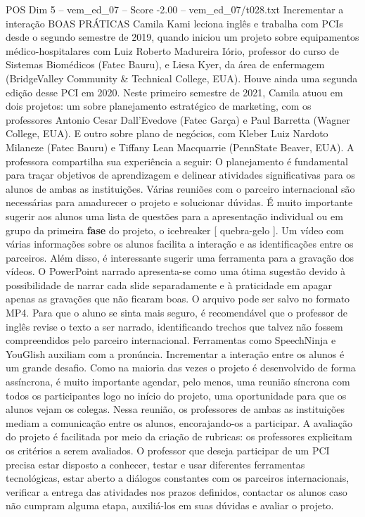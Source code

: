 \begin{textsample}{POS Dim 5 – vem\_ed\_07 – Score -2.00 – vem\_ed\_07/t028.txt}  \label{ex:f5_pos_156}
Incrementar a interação BOAS PRÁTICAS Camila Kami leciona inglês e trabalha com PCIs desde o segundo semestre de 2019, quando iniciou um projeto sobre equipamentos médico-hospitalares com Luiz Roberto Madureira Iório, professor do curso de Sistemas Biomédicos (Fatec Bauru), e Liesa Kyer, da área de enfermagem (BridgeValley Community \& Technical College, EUA).
Houve ainda uma segunda edição desse PCI em 2020.
Neste primeiro semestre de 2021, Camila atuou em dois projetos: um sobre planejamento estratégico de marketing, com os professores Antonio Cesar Dall’Evedove (Fatec Garça) e Paul Barretta (Wagner College, EUA).
E outro sobre plano de negócios, com Kleber Luiz Nardoto Milaneze (Fatec Bauru) e Tiffany Lean Macquarrie (PennState Beaver, EUA).
A professora compartilha sua experiência a seguir: O planejamento é fundamental para traçar objetivos de aprendizagem e delinear atividades significativas para os alunos de ambas as instituições.
Várias reuniões com o parceiro internacional são necessárias para amadurecer o projeto e solucionar dúvidas.
É muito importante sugerir aos alunos uma lista de questões para a apresentação individual ou em grupo da primeira \textbf{fase} do projeto, o icebreaker [ quebra-gelo ].
Um vídeo com várias informações sobre os alunos facilita a interação e as identificações entre os parceiros.
Além disso, é interessante sugerir uma ferramenta para a gravação dos vídeos.
O PowerPoint narrado apresenta-se como uma ótima sugestão devido à possibilidade de narrar cada slide separadamente e à praticidade em apagar apenas as gravações que não ficaram boas.
O arquivo pode ser salvo no formato MP4.
Para que o aluno se sinta mais seguro, é recomendável que o professor de inglês revise o texto a ser narrado, identificando trechos que talvez não fossem compreendidos pelo parceiro internacional.
Ferramentas como SpeechNinja e YouGlish auxiliam com a pronúncia.
Incrementar a interação entre os alunos é um grande desafio.
Como na maioria das vezes o projeto é desenvolvido de forma assíncrona, é muito importante agendar, pelo menos, uma reunião síncrona com todos os participantes logo no início do projeto, uma oportunidade para que os alunos vejam os colegas.
Nessa reunião, os professores de ambas as instituições mediam a comunicação entre os alunos, encorajando-os a participar.
A avaliação do projeto é facilitada por meio da criação de rubricas: os professores explicitam os critérios a serem avaliados.
O professor que deseja participar de um PCI precisa estar disposto a conhecer, testar e usar diferentes ferramentas tecnológicas, estar aberto a diálogos constantes com os parceiros internacionais, verificar a entrega das atividades nos prazos definidos, contactar os alunos caso não cumpram alguma etapa, auxiliá-los em suas dúvidas e avaliar o projeto.

\end{textsample}
